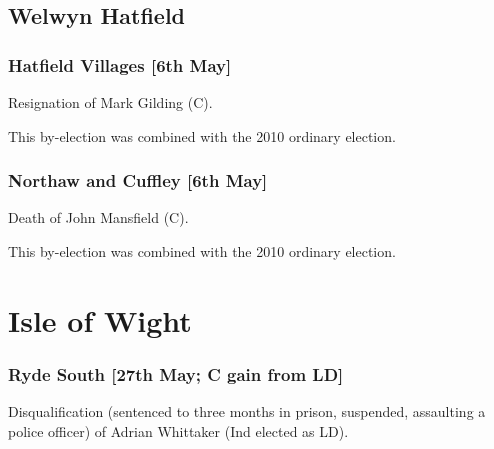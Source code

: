 \begin{resultsiii}
\subsection{Welwyn Hatfield}

\subsubsection*{Hatfield Villages \hspace*{\fill}\nolinebreak[1]%
\enspace\hspace*{\fill}
[6th May]}


Resignation of Mark Gilding (C).

This by-election was combined with the 2010 ordinary election.

\subsubsection*{Northaw and Cuffley \hspace*{\fill}\nolinebreak[1]%
\enspace\hspace*{\fill}
[6th May]}


Death of John Mansfield (C).

This by-election was combined with the 2010 ordinary election.

\section{Isle of Wight}

\subsubsection*{Ryde South \hspace*{\fill}\nolinebreak[1]%
\enspace\hspace*{\fill}
[27th May; C gain from LD]}


Disqualification (sentenced to three months in prison, suspended, assaulting a police officer) of Adrian Whittaker (Ind elected as LD).


\end{resultsiii}
